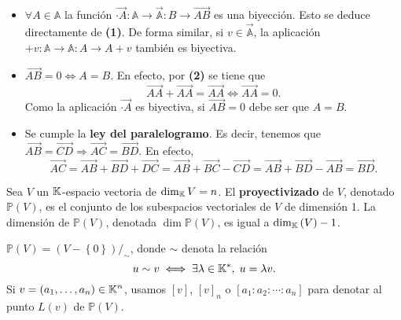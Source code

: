 \begin{observation}
	\begin{itemize}
	\item $\displaystyle \forall A \in \mathbb{A} $ la función $\displaystyle \overrightarrow{ \cdot A} : \mathbb{A} \to \vec{\mathbb{A}} : B \to \overrightarrow{AB} $ es una biyección. Esto se deduce directamente de \textbf{(1)}. De forma similar, si $\displaystyle v \in \vec{\mathbb{A}} $, la aplicación $\displaystyle + v : \mathbb{A} \to \mathbb{A}: A \to A + v $ también es biyectiva.
	\item $\displaystyle \overrightarrow{AB} = 0 \iff A = B $. En efecto, por \textbf{(2)} se tiene que 
		\[\overrightarrow{A A} + \overrightarrow{ A A} = \overrightarrow{A A} \iff \overrightarrow{A A } = 0 .\]
		Como la aplicación $\displaystyle \overrightarrow{ \cdot A} $ es biyectiva, si $\displaystyle \overrightarrow{AB} = 0 $ debe ser que $\displaystyle A = B $. 
	\item Se cumple la \textbf{ley del paralelogramo}. Es decir, tenemos que $\displaystyle \overrightarrow{AB} = \overrightarrow{CD} \Rightarrow \overrightarrow{AC} = \overrightarrow{BD} $. En efecto,
		\[\overrightarrow{AC} = \overrightarrow{AB} + \overrightarrow{BD} + \overrightarrow{DC} = \overrightarrow{AB} + \overrightarrow{BC}-\overrightarrow{CD} = \overrightarrow{AB} + \overrightarrow{BD} - \overrightarrow{AB} = \overrightarrow{BD} .\]
	
	\end{itemize} 
\end{observation}
\begin{definition}
Sea $\displaystyle V $ un $\displaystyle \mathbb{K} $-espacio vectoria de $\displaystyle \dim _{\mathbb{K}}V = n $. El \textbf{proyectivizado} de $\displaystyle V $, denotado $\displaystyle \mathbb{P}\left(V\right) $, es el conjunto de los subespacios vectoriales de $\displaystyle V $ de dimensión 1. La dimensión de $\displaystyle \mathbb{P}\left(V\right) $, denotada $\displaystyle \dim \mathbb{P}\left(V\right) $, es igual a $\displaystyle \dim _{\mathbb{K}}\left(V\right) -1 $.
\end{definition}
\begin{observation}
	$\displaystyle \mathbb{P}\left(V\right) = \left(V- \left\{ 0\right\} \right)/_{\sim} $, donde $\displaystyle \sim $ denota la relación
	\[u \sim v \iff \exists \lambda \in \mathbb{K} ^{*}, \; u = \lambda v .\]
	Si $\displaystyle v = \left(a_{1}, \ldots, a_{n}\right) \in \mathbb{K}^{n} $, usamos $\displaystyle [v] $, $\displaystyle [v]_{n} $ o $\displaystyle [a_{1} : a_{2} : \cdots : a_{n}] $ para denotar al punto $\displaystyle L\left(v\right) $ de $\displaystyle \mathbb{P}\left(V\right) $.
\end{observation}
